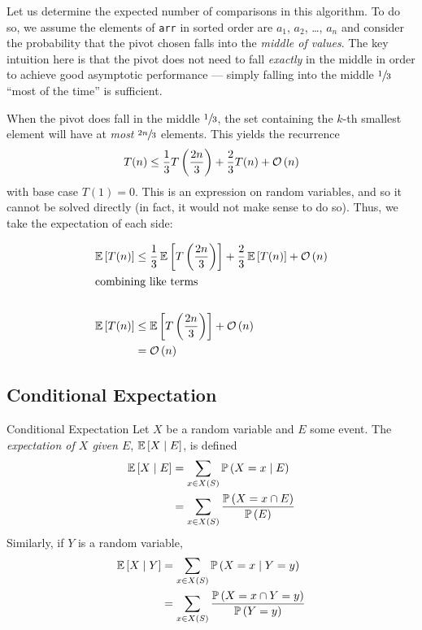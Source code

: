 Let us determine the expected number of comparisons in this algorithm. To do so,
we assume the elements of \texttt{arr} in sorted order are $a_1$, $a_2$, \dots,
$a_n$ and consider the probability that the pivot chosen falls into the
\emph{middle  of values}. The key intuition here is that the pivot
does not need to fall \emph{exactly} in the middle in order to achieve good
asymptotic performance --- simply falling into the middle $\sfrac{1}{3}$ ``most
of the time'' is sufficient.

When the pivot does fall in the middle $\sfrac{1}{3}$, the set containing the
$k$-th smallest element will have at \emph{most} $\sfrac{2n}{3}$ elements. This
yields the recurrence
\[T(n) \leq \frac{1}{3}T\left(\frac{2n}{3}\right) + \frac{2}{3}T(n) + \mathcal{O}\left(n\right)\]
with base case $T(1) = 0$. This is an expression on random variables, and so it
cannot be solved directly (in fact, it would not make sense to do so). Thus, we
take the expectation of each side:

\begin{align*}\operatorname{\mathbb{E}}\left[T(n)\right]
    &\leq \frac{1}{3}\operatorname{\mathbb{E}}\left[T\left(\frac{2n}{3}\right)\right] + \frac{2}{3}\operatorname{\mathbb{E}}\left[T(n)\right] + \mathcal{O}\left(n\right)\\
    \shortintertext{combining like terms}\\
    \operatorname{\mathbb{E}}\left[T(n)\right] &\leq \operatorname{\mathbb{E}}\left[T\left(\frac{2n}{3}\right)\right] + \mathcal{O}\left(n\right)\\
    &= \mathcal{O}\left(n\right) 
\end{align*}

\subsection{Conditional Expectation}
\begin{definition}{Conditional Expectation}{}
    Let $X$ be a random variable and $E$ some event. The \emph{expectation of
    $X$ given $E$}, $\operatorname{\mathbb{E}}\left[X \mid E\right]$, is defined
    \begin{align*}\operatorname{\mathbb{E}}\left[X \mid E\right]
        &=\sum_{x \in X(S)} \operatorname{\mathbb{P}}\left(X = x \mid E\right)\\
        &=\sum_{x \in X(S)} \frac{\operatorname{\mathbb{P}}\left(X = x \cap E\right)}{\operatorname{\mathbb{P}}\left(E\right)}
    \end{align*}
    Similarly, if $Y$ is a random variable, 
    \begin{align*}\operatorname{\mathbb{E}}\left[X \mid Y\right]
        &=\sum_{x \in X(S)} \operatorname{\mathbb{P}}\left(X = x \mid Y = y\right)\\
        &=\sum_{x \in X(S)} \frac{\operatorname{\mathbb{P}}\left(X = x \cap Y = y\right)}{\operatorname{\mathbb{P}}\left(Y = y\right)}
    \end{align*}
\end{definition}

